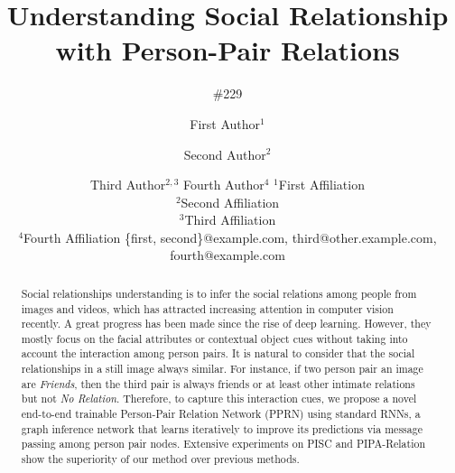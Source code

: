 \documentclass{article}
\title{Understanding Social Relationship with Person-Pair Relations}
\author{
    \#229
}
\author{
First Author$^1$
\and
Second Author$^2$\and
Third Author$^{2,3}$\And
Fourth Author$^4$
\affiliations
$^1$First Affiliation\\
$^2$Second Affiliation\\
$^3$Third Affiliation\\
$^4$Fourth Affiliation
\emails
\{first, second\}@example.com,
third@other.example.com,
fourth@example.com
}
\newcommand{\PPRN}{{\sf PPRN}}
\begin{document}
\maketitle

\begin{abstract}

Social relationships understanding is to infer the social relations among people from images and videos, which has attracted increasing attention in computer vision recently. A great progress has been made since the rise of deep learning. However, they mostly focus on the facial attributes or contextual object cues without taking into account the interaction among person pairs. It is natural to consider that the social relationships in a still image always similar. For instance, if two person pair an image are {\it Friends}, then the third pair is always friends or at least other intimate relations but not {\it No Relation}. Therefore, to capture this interaction cues, we propose a novel end-to-end trainable Person-Pair Relation Network (\PPRN) using standard RNNs, a graph inference network that learns iteratively to improve its predictions via message passing among person pair nodes. Extensive experiments on PISC and PIPA-Relation show the superiority of our method over previous methods.

\end{abstract}
\end{document}
